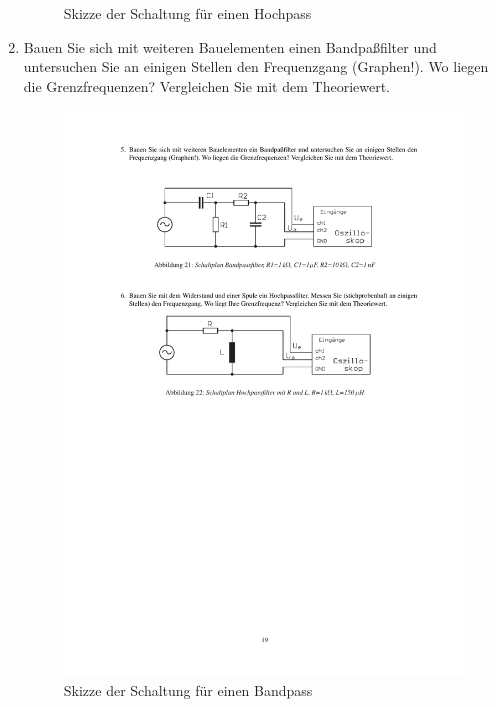 \documentclass[12pt]{scrartcl}
\begin{document}
\begin{enumerate}
\begin{figure}[htbp]
  	\caption[Skizze der Schaltung für einen Hockpass]{Skizze der Schaltung für einen Hochpass\footnotemark}
  \label{fig:Hochpass}
\end{figure}
\item
Bauen Sie sich mit weiteren Bauelementen einen Bandpaßfilter und untersuchen Sie an einigen Stellen den Frequenzgang (Graphen!). Wo liegen die Grenzfrequenzen? Vergleichen Sie mit dem Theoriewert.
\begin{figure}[htbp] 
  \centering
    \includegraphics[trim = 20mm 220mm 1mm 30mm, clip, scale = 1]{bandpass_hochpass.pdf}
  	\caption[Skizze der Schaltung für einen Bandpass]{Skizze der Schaltung für einen Bandpass\footnotemark}
  \label{fig:Bandpass}

\end{figure}
\end{enumerate}
\end{document}
